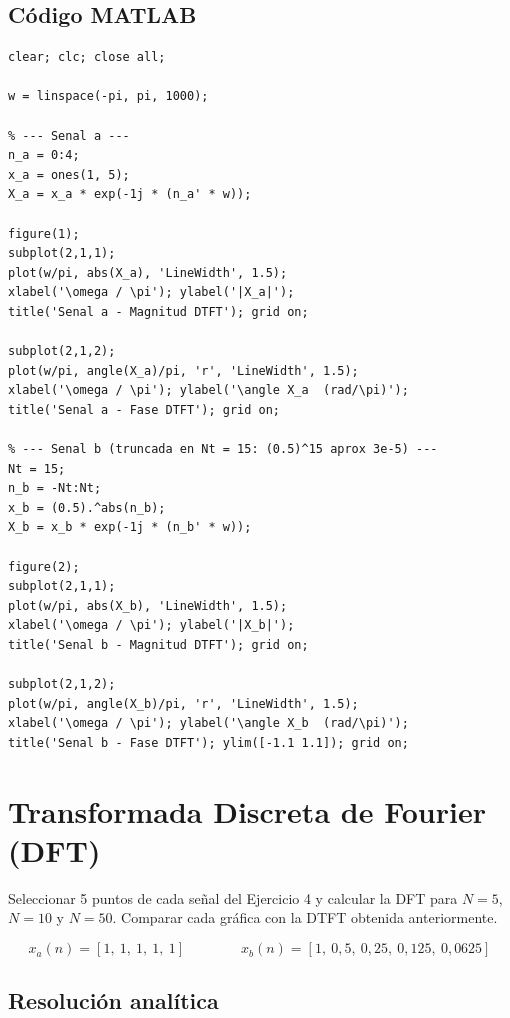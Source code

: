 \documentclass[../Main_Include.tex]{subfiles}
\begin{document}
\subsection*{Código MATLAB}

\begin{lstlisting}[style=matlab_dark,
    caption={Ejercicio 4 --- DTFT de se\~nales discretas},
    label={lst:ej4}]
% ETN1015 - Ejercicio 4: DTFT de senales discretas
clear; clc; close all;

w = linspace(-pi, pi, 1000);

% --- Senal a ---
n_a = 0:4;
x_a = ones(1, 5);
X_a = x_a * exp(-1j * (n_a' * w));

figure(1);
subplot(2,1,1);
plot(w/pi, abs(X_a), 'LineWidth', 1.5);
xlabel('\omega / \pi'); ylabel('|X_a|');
title('Senal a - Magnitud DTFT'); grid on;

subplot(2,1,2);
plot(w/pi, angle(X_a)/pi, 'r', 'LineWidth', 1.5);
xlabel('\omega / \pi'); ylabel('\angle X_a  (rad/\pi)');
title('Senal a - Fase DTFT'); grid on;

% --- Senal b (truncada en Nt = 15: (0.5)^15 aprox 3e-5) ---
Nt = 15;
n_b = -Nt:Nt;
x_b = (0.5).^abs(n_b);
X_b = x_b * exp(-1j * (n_b' * w));

figure(2);
subplot(2,1,1);
plot(w/pi, abs(X_b), 'LineWidth', 1.5);
xlabel('\omega / \pi'); ylabel('|X_b|');
title('Senal b - Magnitud DTFT'); grid on;

subplot(2,1,2);
plot(w/pi, angle(X_b)/pi, 'r', 'LineWidth', 1.5);
xlabel('\omega / \pi'); ylabel('\angle X_b  (rad/\pi)');
title('Senal b - Fase DTFT'); ylim([-1.1 1.1]); grid on;
\end{lstlisting}

\newpage
\section{Transformada Discreta de Fourier (DFT)}

Seleccionar 5 puntos de cada señal del Ejercicio 4 y calcular la DFT
para $N = 5$, $N = 10$ y $N = 50$. Comparar cada gráfica con la DTFT
obtenida anteriormente.

\[
    x_a(n) = [1,\ 1,\ 1,\ 1,\ 1]
    \qquad\qquad
    x_b(n) = [1,\ 0{,}5,\ 0{,}25,\ 0{,}125,\ 0{,}0625]
\]

\subsection*{Resolución analítica}
\end{document}
